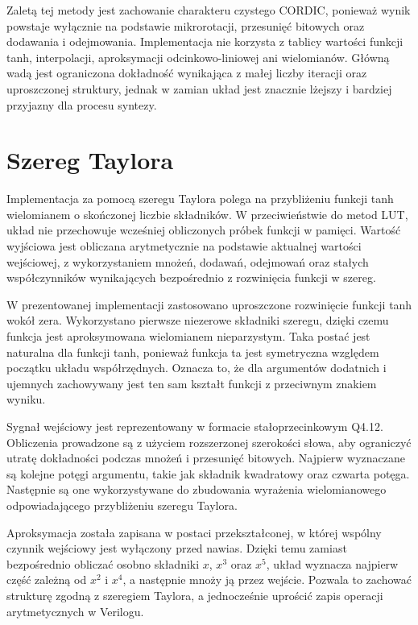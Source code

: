 \documentclass[12pt, a4paper, oneside]{scrreprt}
\begin{document}
Zaletą tej metody jest zachowanie charakteru czystego CORDIC, ponieważ wynik powstaje
wyłącznie na podstawie mikrorotacji, przesunięć bitowych oraz dodawania i odejmowania.
Implementacja nie korzysta z tablicy wartości funkcji tanh, interpolacji, aproksymacji
odcinkowo-liniowej ani wielomianów. Główną wadą jest ograniczona dokładność
wynikająca z małej liczby iteracji oraz uproszczonej struktury, jednak w zamian
układ jest znacznie lżejszy i bardziej przyjazny dla procesu syntezy.



\section{Szereg Taylora}

Implementacja za pomocą szeregu Taylora polega na przybliżeniu funkcji tanh wielomianem o
skończonej liczbie składników. W przeciwieństwie do metod LUT, układ nie przechowuje
wcześniej obliczonych próbek funkcji w pamięci. Wartość wyjściowa jest obliczana
arytmetycznie na podstawie aktualnej wartości wejściowej, z wykorzystaniem mnożeń,
dodawań, odejmowań oraz stałych współczynników wynikających bezpośrednio z rozwinięcia
funkcji w szereg.

W prezentowanej implementacji zastosowano uproszczone rozwinięcie funkcji tanh wokół zera.
Wykorzystano pierwsze niezerowe składniki szeregu, dzięki czemu funkcja jest aproksymowana
wielomianem nieparzystym. Taka postać jest naturalna dla funkcji tanh, ponieważ funkcja ta
jest symetryczna względem początku układu współrzędnych. Oznacza to, że dla argumentów
dodatnich i ujemnych zachowywany jest ten sam kształt funkcji z przeciwnym znakiem wyniku.

Sygnał wejściowy jest reprezentowany w formacie stałoprzecinkowym Q4.12. Obliczenia prowadzone
są z użyciem rozszerzonej szerokości słowa, aby ograniczyć utratę dokładności podczas mnożeń i
przesunięć bitowych. Najpierw wyznaczane są kolejne potęgi argumentu, takie jak składnik
kwadratowy oraz czwarta potęga. Następnie są one wykorzystywane do zbudowania wyrażenia
wielomianowego odpowiadającego przybliżeniu szeregu Taylora.

Aproksymacja została zapisana w postaci przekształconej, w której wspólny czynnik wejściowy
jest wyłączony przed nawias. Dzięki temu zamiast bezpośrednio obliczać osobno składniki
$x$, $x^3$ oraz $x^5$, układ wyznacza najpierw część zależną od $x^2$ i $x^4$, a następnie
mnoży ją przez wejście. Pozwala to zachować strukturę zgodną z szeregiem Taylora,
a jednocześnie uprościć zapis operacji arytmetycznych w Verilogu.
\end{document}
